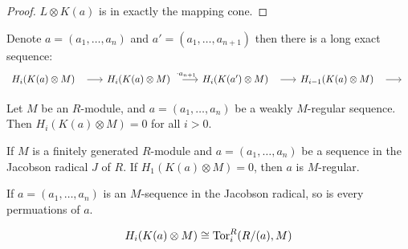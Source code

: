 \begin{definition}
\begin{lemma}
\begin{proof}
	$L \otimes K(a)$ is in exactly the mapping cone.
\end{proof}

\end{lemma}


\begin{corollary}
	\label{cor:tensor_koszul_induced_long_exact_seq}
	Denote $a = (a_1, \dots, a_n)$ and $a' = (a_1, \dots, a_{n+1})$ then there is a long exact sequence:
\[\begin{tikzcd}
	{H_i(K(a) \otimes M)} & {H_i(K(a) \otimes M)} & {H_i(K(a') \otimes M)} & {H_{i-1}(K(a) \otimes M)} & 
	\arrow[shorten <=8pt, from=1-1, to=1-2]
	\arrow[shorten <=8pt, "{\cdot a_{n+1}}", from=1-2, to=1-3]
	\arrow[shorten <=8pt, from=1-3, to=1-4]
	\arrow[shorten <=8pt, from=1-4, to=1-5]
\end{tikzcd}\]
\end{corollary}

\begin{theorem}
	\label{thm:reg_seq_implies_koszul_exact}
	Let $M$ be an $R$-module, and $a = (a_1, \dots, a_n)$ be a weakly $M$-regular sequence.
	Then $H_i(K(a) \otimes M) = 0$ for all $i > 0$.
\end{theorem}

\begin{lemma}
	\label{lem:reg_in_jrad_iff_koszul_exact_at_one}
	If $M$ is a finitely generated $R$-module and $a = (a_1, \dots, a_n)$ be a sequence in the Jacobson radical $J$ of $R$.
	If $H_1(K(a) \otimes M) = 0$, then $a$ is $M$-regular.
\end{lemma}

\begin{corollary}
	\label{cor:perm_of_reg_seq_in_jrad_is_reg}
	If $a = (a_1, \dots, a_n)$ is an $M$-sequence in the Jacobson radical, so is every permuations of $a$.
\end{corollary}

\begin{lemma}
	\label{thm:KoszulComplex_res_quotient_ring}
\end{lemma}

\begin{lemma}
	\label{lem:tor_measures_koszul_homology}
	$$H_i(K(a) \otimes M) \cong \operatorname{Tor}_i^R (R/(a), M)$$
\end{lemma}


\end{definition}
